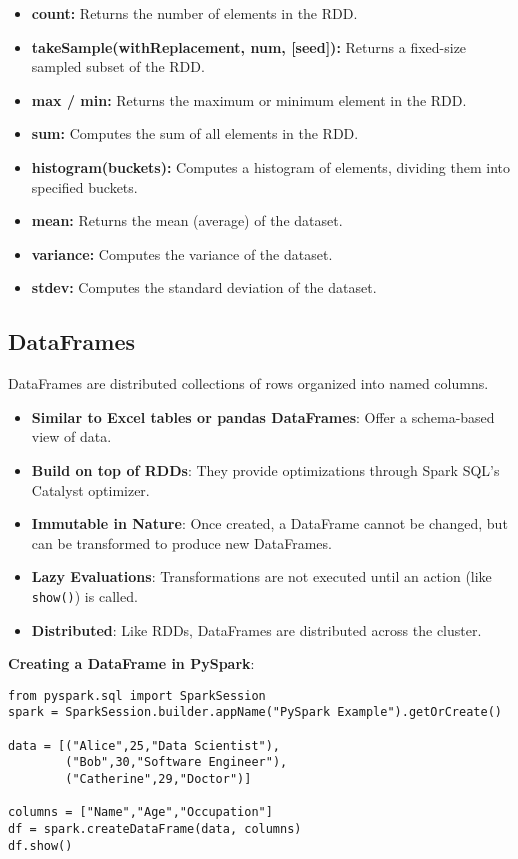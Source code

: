 \documentclass[12pt]{article}
\begin{document}
\begin{itemize}
    \item \textbf{count:} Returns the number of elements in the RDD.
    
    \item \textbf{takeSample(withReplacement, num, [seed]):} Returns a fixed-size sampled subset of the RDD.
    
    \item \textbf{max / min:} Returns the maximum or minimum element in the RDD.
    
    \item \textbf{sum:} Computes the sum of all elements in the RDD.
    
    \item \textbf{histogram(buckets):} Computes a histogram of elements, dividing them into specified buckets.
    
    \item \textbf{mean:} Returns the mean (average) of the dataset.
    
    \item \textbf{variance:} Computes the variance of the dataset.
    
    \item \textbf{stdev:} Computes the standard deviation of the dataset.
\end{itemize}


\subsection{DataFrames}
DataFrames are distributed collections of rows organized into named columns.

\begin{itemize}
    \item \textbf{Similar to Excel tables or pandas DataFrames}: Offer a schema-based view of data.
    \item \textbf{Build on top of RDDs}: They provide optimizations through Spark SQL’s Catalyst optimizer.
    \item \textbf{Immutable in Nature}: Once created, a DataFrame cannot be changed, but can be transformed to produce new DataFrames.
    \item \textbf{Lazy Evaluations}: Transformations are not executed until an action (like \texttt{show()}) is called.
    \item \textbf{Distributed}: Like RDDs, DataFrames are distributed across the cluster.
\end{itemize}

\noindent\textbf{Creating a DataFrame in PySpark}:
\begin{verbatim}
from pyspark.sql import SparkSession
spark = SparkSession.builder.appName("PySpark Example").getOrCreate()

data = [("Alice",25,"Data Scientist"),
        ("Bob",30,"Software Engineer"),
        ("Catherine",29,"Doctor")]

columns = ["Name","Age","Occupation"]
df = spark.createDataFrame(data, columns)
df.show()
\end{verbatim}
\end{document}
